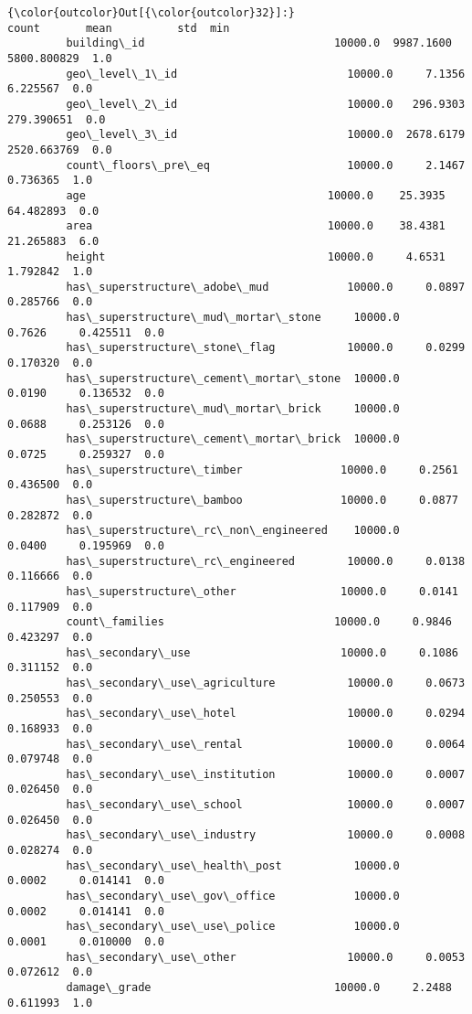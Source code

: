 \documentclass[11pt]{article}
\begin{document}
\begin{Verbatim}[commandchars=\\\{\}]
{\color{outcolor}Out[{\color{outcolor}32}]:}                                           count       mean          std  min  
         building\_id                             10000.0  9987.1600  5800.800829  1.0   
         geo\_level\_1\_id                          10000.0     7.1356     6.225567  0.0   
         geo\_level\_2\_id                          10000.0   296.9303   279.390651  0.0   
         geo\_level\_3\_id                          10000.0  2678.6179  2520.663769  0.0   
         count\_floors\_pre\_eq                     10000.0     2.1467     0.736365  1.0   
         age                                     10000.0    25.3935    64.482893  0.0   
         area                                    10000.0    38.4381    21.265883  6.0   
         height                                  10000.0     4.6531     1.792842  1.0   
         has\_superstructure\_adobe\_mud            10000.0     0.0897     0.285766  0.0   
         has\_superstructure\_mud\_mortar\_stone     10000.0     0.7626     0.425511  0.0   
         has\_superstructure\_stone\_flag           10000.0     0.0299     0.170320  0.0   
         has\_superstructure\_cement\_mortar\_stone  10000.0     0.0190     0.136532  0.0   
         has\_superstructure\_mud\_mortar\_brick     10000.0     0.0688     0.253126  0.0   
         has\_superstructure\_cement\_mortar\_brick  10000.0     0.0725     0.259327  0.0   
         has\_superstructure\_timber               10000.0     0.2561     0.436500  0.0   
         has\_superstructure\_bamboo               10000.0     0.0877     0.282872  0.0   
         has\_superstructure\_rc\_non\_engineered    10000.0     0.0400     0.195969  0.0   
         has\_superstructure\_rc\_engineered        10000.0     0.0138     0.116666  0.0   
         has\_superstructure\_other                10000.0     0.0141     0.117909  0.0   
         count\_families                          10000.0     0.9846     0.423297  0.0   
         has\_secondary\_use                       10000.0     0.1086     0.311152  0.0   
         has\_secondary\_use\_agriculture           10000.0     0.0673     0.250553  0.0   
         has\_secondary\_use\_hotel                 10000.0     0.0294     0.168933  0.0   
         has\_secondary\_use\_rental                10000.0     0.0064     0.079748  0.0   
         has\_secondary\_use\_institution           10000.0     0.0007     0.026450  0.0   
         has\_secondary\_use\_school                10000.0     0.0007     0.026450  0.0   
         has\_secondary\_use\_industry              10000.0     0.0008     0.028274  0.0   
         has\_secondary\_use\_health\_post           10000.0     0.0002     0.014141  0.0   
         has\_secondary\_use\_gov\_office            10000.0     0.0002     0.014141  0.0   
         has\_secondary\_use\_use\_police            10000.0     0.0001     0.010000  0.0   
         has\_secondary\_use\_other                 10000.0     0.0053     0.072612  0.0   
         damage\_grade                            10000.0     2.2488     0.611993  1.0   
        
\end{Verbatim}
            
\end{document}
